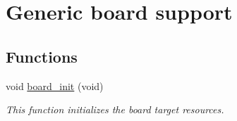 \hypertarget{group__group__common__boards}{\section{Generic board support}
\label{group__group__common__boards}
}
\subsection*{Functions}
\begin{DoxyCompactItemize}
\item 
void \hyperlink{group__group__common__boards_ga916f2adc2080b4fe88034086d107a8dc}{board\-\_\-init} (void)
\begin{DoxyCompactList}\small\item\em This function initializes the board target resources. \end{DoxyCompactList}\end{DoxyCompactItemize}

